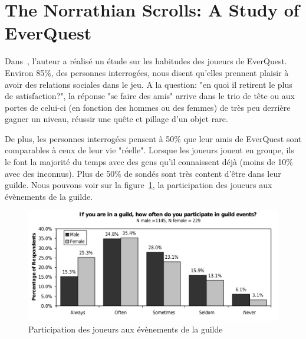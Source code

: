 \documentclass[11pt,a4paper]{article}
\begin{document}
\section{The Norrathian Scrolls: A Study of EverQuest}
Dans~\cite{StudyEQ}, l'auteur a réalisé un étude sur les habitudes des joueurs de EverQuest. Environ 85\%, des personnes interrogées, nous disent qu'elles prennent plaisir à avoir des relations sociales dans le jeu. A la question: "en quoi il retirent le plus de satisfaction?", la réponse "se faire des amis" arrive dans le trio de tête ou aux portes de celui-ci (en fonction des hommes ou des femmes) de très peu derrière gagner un niveau, réussir une quête et pillage d'un objet rare.
\par De plus, les personnes interrogées pensent à 50\% que leur amis de EverQuest sont comparables à ceux de leur vie "réelle". Lorsque les joueurs jouent en groupe, ils le font la majorité du temps avec des gens qu'il connaissent déjà (moins de 10\% avec des inconnus). Plus de 50\% de sondés sont très content d'être dans leur guilde. Nous pouvons voir sur la figure~\ref{guildpres}, la participation des joueurs aux évènements de la guilde.
	\begin{figure}[!h]
        \centering
        \includegraphics[scale=0.95]{./images/studypres.png}
        \caption{Participation des joueurs aux évènements de la guilde}
        \label{guildpres}
        \end{figure}

\newpage




 
\end{document}
